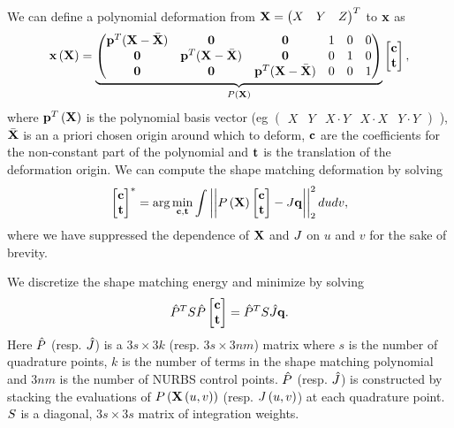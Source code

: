 We can define a polynomial deformation from $\mathbf{X} = \begin{pmatrix} X & Y & Z \end{pmatrix}^T$ to $\mathbf{x}$  as 
\begin{equation}
    \mathbf{x}\left(\mathbf{X}\right) = 
    \underbrace{\begin{pmatrix}
    \mathbf{p}^T(\mathbf{X}-\bar{\mathbf{X}}) & \mathbf{0} & \mathbf{0} & 1 & 0 & 0\\
    \mathbf{0} & \mathbf{p}^T(\mathbf{X}-\bar{\mathbf{X}}) & \mathbf{0} & 0 & 1 & 0\\
    \mathbf{0} & \mathbf{0} & \mathbf{p}^T(\mathbf{X}-\bar{\mathbf{X}}) & 0 & 0 & 1\\
    \end{pmatrix}}_{P\left(\mathbf{X}\right)}
    \begin{bmatrix} \mathbf{c}\\ \mathbf{t} \end{bmatrix},
    \label{eq:projection}
\end{equation} where $\mathbf{p}^T\left(\mathbf{X}\right)$ is the polynomial basis vector \newline (eg $\begin{pmatrix} X & Y & X\cdot Y & X\cdot X & Y\cdot Y \end{pmatrix}$ ),
$\bar{\mathbf{X}}$ is an a priori chosen origin around which to deform, $\mathbf{c}$ are the coefficients for the 
non-constant part of the polynomial and $\mathbf{t}$ is the translation of the deformation origin. 
We can compute the shape matching deformation by solving~\cite{10.1145/1073204.1073216}
\begin{equation}
   \begin{bmatrix} \mathbf{c}\\ \mathbf{t} \end{bmatrix}^* = \arg\min_{\mathbf{c},\mathbf{t}} \int \left\lvert\left\lvert P\left(\mathbf{X}\right)\begin{bmatrix} \mathbf{c}\\ \mathbf{t} \end{bmatrix} - J\mathbf{q}\right\rvert\right\rvert^2_2 dudv,
\end{equation} where we have suppressed the dependence of $\mathbf{X}$ and $J$ on $u$ and $v$ for the sake of brevity.

We discretize the shape matching energy and minimize by solving
\begin{equation}
\hat{P}^TS\hat{P}\begin{bmatrix} \mathbf{c}\\ \mathbf{t} \end{bmatrix} = \hat{P}^TS\hat{J}\mathbf{q}.
\label{eq:shapematch}
\end{equation} Here $\hat{P}$ (resp. $\hat{J}$) is a $3s \times 3k$ (resp. $3s \times 3nm$) matrix where $s$ is the number of quadrature points, 
$k$ is the number of  terms in the shape matching polynomial and $3nm$ is the number of NURBS control points. 
$\hat{P}$ (resp. $\hat{J}$) is constructed by stacking the evaluations of $P\left(\mathbf{X}\left(u,v\right)\right)$ (resp. $J\left(u, v\right)$) at each
quadrature point.
$S$ is a diagonal, $3s \times 3s$ matrix of integration weights.

